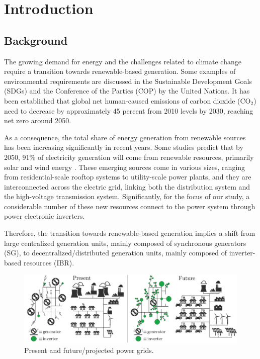 \chapter{Introduction}
\section{Background}

The growing demand for energy and the challenges related to climate change
require a transition towards renewable-based generation. Some examples of
environmental requirements are discussed in the Sustainable Development Goals
(SDGs) \cite{sdgs} and the Conference of the Parties (COP) \cite{COP} by the
United Nations. It has been established that global net human-caused emissions
of carbon dioxide ($\text{CO}_2$) need to decrease by approximately 45 percent
from 2010 levels by 2030, reaching net zero around 2050.

As a consequence, the total share of energy generation from renewable sources
has been increasing significantly in recent years. Some studies predict that by
2050, 91\% of electricity generation will come from renewable resources,
primarily solar and wind energy \cite{irena}. These emerging sources come in
various sizes, ranging from residential-scale rooftop systems to utility-scale
power plants, and they are interconnected across the electric grid, linking both
the distribution system and the high-voltage transmission system. Significantly,
for the focus of our study, a considerable number of these new resources connect
to the power system through power electronic inverters\cite{osti}.

Therefore, the transition towards renewable-based generation implies a shift
from large centralized generation units, mainly composed of synchronous
generators (SG), to decentralized/distributed generation units, mainly composed
of inverter-based resources (IBR).

\begin{figure}[h!]
    \centering
    \includegraphics[width=14cm]{images/future_grid.png}
    \caption{Present and future/projected power grids\cite{osti}.}
    \label{fig:future_grid}
\end{figure}

